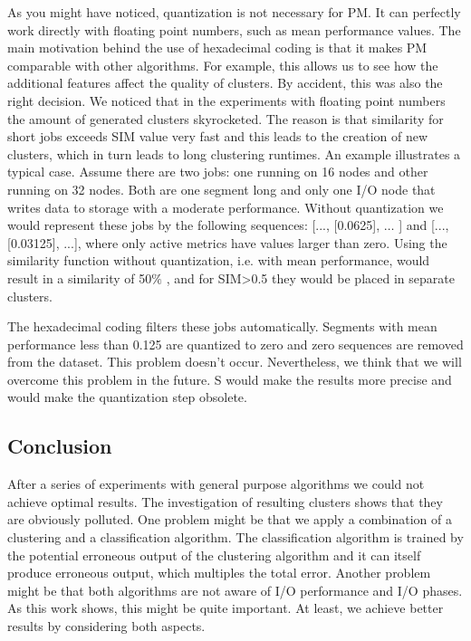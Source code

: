 \documentclass[]{llncs}
\begin{document}
{{{{As you might have noticed, quantization is not necessary for PM.
It can perfectly work directly with floating point numbers, such as mean performance values.
The main motivation behind the use of hexadecimal coding is that it makes PM comparable with other algorithms.
For example, this allows us to see how the additional features affect the quality of clusters.
By accident, this was also the right decision.
We noticed that in the experiments with floating point numbers the amount of generated clusters skyrocketed.
The reason is that similarity for short jobs exceeds SIM value very fast and this leads to the creation of new clusters, which in turn leads to long clustering runtimes.
An example illustrates a typical case.
Assume there are two jobs: one running on 16 nodes and other running on 32 nodes.
Both are one segment long and only one I/O node that writes data to storage with a moderate performance.
Without quantization we would represent these jobs by the following sequences:  [..., [0.0625], $ \ldots $ ] and [..., [0.03125], ...], where only active metrics have values larger than zero.
Using the similarity function without quantization, i.e.
with mean performance, would result in a similarity of 50$\%$ , and for SIM>0.5 they would be placed in separate clusters.

The hexadecimal coding filters these jobs automatically. Segments with mean performance less than 0.125 are quantized to zero and zero sequences are removed from the dataset. This problem doesn’t occur.
Nevertheless, we think that we will overcome this problem in the future.
S would make the results more precise and would make the quantization step
obsolete.

\subsection{Conclusion}
After a series of experiments with general purpose algorithms we could not achieve optimal results.
The investigation of resulting clusters shows that they are obviously polluted.
One problem might be that we apply a combination of a clustering and a classification algorithm.
The classification algorithm is trained by the potential erroneous output of the clustering algorithm and it can itself produce erroneous output, which multiples the total error.
Another problem might be that both algorithms are not aware of I/O performance and I/O phases.
As this work shows, this might be quite important.
At least, we achieve better results by considering both aspects.


}}}}
\end{document}
